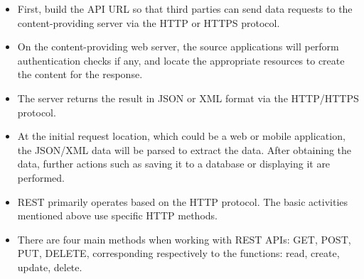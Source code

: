 \documentclass[../Main.tex]{subfiles}
\begin{document}
\begin{itemize}
    \item First, build the API URL so that third parties can send data requests to the content-providing server via the HTTP or HTTPS protocol.
    \item On the content-providing web server, the source applications will perform authentication checks if any, and locate the appropriate resources to create the content for the response.
    \item The server returns the result in JSON or XML format via the HTTP/HTTPS protocol.
    \item At the initial request location, which could be a web or mobile application, the JSON/XML data will be parsed to extract the data.
          After obtaining the data, further actions such as saving it to a database or displaying it are performed.
    \item REST primarily operates based on the HTTP protocol.
          The basic activities mentioned above use specific HTTP methods.
    \item There are four main methods when working with REST APIs: GET, POST, PUT, DELETE, corresponding respectively to the functions: read, create, update, delete.
\end{itemize}
\end{document}
